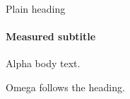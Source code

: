 \documentclass[11pt,aspectratio=169]{beamer}
\date{}
\begin{document}
\begin{frame}[plain,t]{Plain heading}
\framesubtitle{Measured subtitle}
Alpha body text.

Omega follows the heading.
\end{frame}
\end{document}
